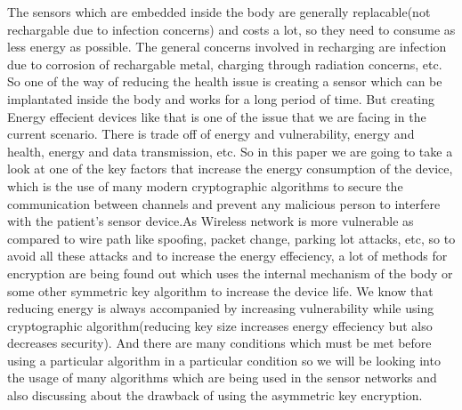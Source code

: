 \documentclass[conference]{IEEEtran}
\begin{document}
The sensors which are embedded inside the body are generally replacable(not rechargable due to infection concerns) and costs a lot, so they need to consume as less energy as possible. The general concerns involved in recharging are infection due to corrosion of rechargable metal, charging through radiation concerns, etc. So one of the way of reducing the health issue is creating a sensor which can be implantated inside the body and works for a long period of time. But creating Energy effecient devices like that is one of the issue that we are facing in the current scenario. There is trade off of energy and vulnerability, energy and health, energy and data transmission, etc. So in this paper we are going to take a look at one of the key factors that increase the energy consumption of the device, which is the use of many modern cryptographic algorithms to secure the communication between channels and prevent any malicious person to interfere with the patient's sensor device.As Wireless network is more vulnerable as compared to wire path like spoofing, packet change, parking lot attacks, etc, so to avoid all these attacks and to increase the energy effeciency, a lot of methods for encryption are being found out which uses the internal mechanism of the body or some other symmetric key algorithm to increase the device life. We know that reducing energy is always accompanied by increasing vulnerability while using cryptographic algorithm(reducing key size increases energy effeciency but also decreases security). And there are many conditions which must be met before using a particular algorithm in a particular condition so we will be looking into the usage of many algorithms which are being used in the sensor networks and also discussing about the drawback of using the asymmetric key encryption.
\end{document}
